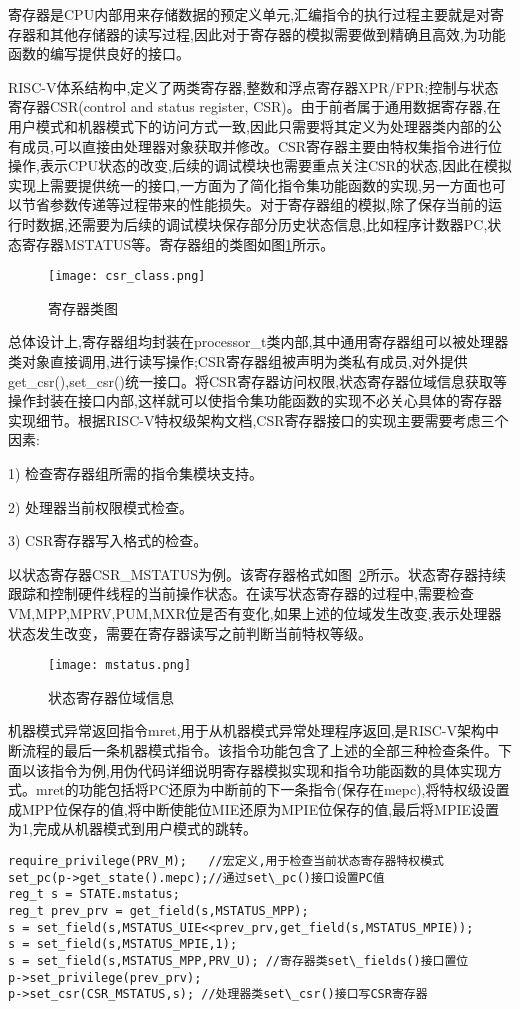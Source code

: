 寄存器是CPU内部用来存储数据的预定义单元,汇编指令的执行过程主要就是对寄存器和其他存储器的读写过程,因此对于寄存器的模拟需要做到精确且高效,为功能函数的编写提供良好的接口。


RISC-V体系结构中,定义了两类寄存器,整数和浮点寄存器XPR/FPR;控制与状态寄存器CSR(control and status register, CSR)。由于前者属于通用数据寄存器,在用户模式和机器模式下的访问方式一致,因此只需要将其定义为处理器类内部的公有成员,可以直接由处理器对象获取并修改。CSR寄存器主要由特权集指令进行位操作,表示CPU状态的改变,后续的调试模块也需要重点关注CSR的状态,因此在模拟实现上需要提供统一的接口,一方面为了简化指令集功能函数的实现,另一方面也可以节省参数传递等过程带来的性能损失。对于寄存器组的模拟,除了保存当前的运行时数据,还需要为后续的调试模块保存部分历史状态信息,比如程序计数器PC,状态寄存器MSTATUS等。寄存器组的类图如图\ref{fig:csr_class}所示。
\begin{figure}[h]
    \centering
    \texttt{[image: csr\_class.png]}
    \caption{寄存器类图}
    \label{fig:csr_class}
\end{figure}

总体设计上,寄存器组均封装在processor\_t类内部,其中通用寄存器组可以被处理器类对象直接调用,进行读写操作;CSR寄存器组被声明为类私有成员,对外提供get\_csr(),set\_csr()统一接口。将CSR寄存器访问权限,状态寄存器位域信息获取等操作封装在接口内部,这样就可以使指令集功能函数的实现不必关心具体的寄存器实现细节。根据RISC-V特权级架构文档,CSR寄存器接口的实现主要需要考虑三个因素:


1) 检查寄存器组所需的指令集模块支持。


2) 处理器当前权限模式检查。


3) CSR寄存器写入格式的检查。


以状态寄存器CSR\_MSTATUS为例。该寄存器格式如图~\ref{fig:mstatus}所示。状态寄存器持续跟踪和控制硬件线程的当前操作状态。在读写状态寄存器的过程中,需要检查VM,MPP,MPRV,PUM,MXR位是否有变化,如果上述的位域发生改变,表示处理器状态发生改变，需要在寄存器读写之前判断当前特权等级。
\begin{figure}[H]
    \centering
    \texttt{[image: mstatus.png]}
    \caption{状态寄存器位域信息}
    \label{fig:mstatus}
\end{figure}


机器模式异常返回指令mret,用于从机器模式异常处理程序返回,是RISC-V架构中断流程的最后一条机器模式指令。该指令功能包含了上述的全部三种检查条件。下面以该指令为例,用伪代码详细说明寄存器模拟实现和指令功能函数的具体实现方式。mret的功能包括将PC还原为中断前的下一条指令(保存在mepc),将特权级设置成MPP位保存的值,将中断使能位MIE还原为MPIE位保存的值,最后将MPIE设置为1,完成从机器模式到用户模式的跳转。
\begin{lstlisting}
require_privilege(PRV_M);   //宏定义,用于检查当前状态寄存器特权模式
set_pc(p->get_state().mepc);//通过set\_pc()接口设置PC值
reg_t s = STATE.mstatus;    
reg_t prev_prv = get_field(s,MSTATUS_MPP);
s = set_field(s,MSTATUS_UIE<<prev_prv,get_field(s,MSTATUS_MPIE));
s = set_field(s,MSTATUS_MPIE,1); 
s = set_field(s,MSTATUS_MPP,PRV_U); //寄存器类set\_fields()接口置位
p->set_privilege(prev_prv);
p->set_csr(CSR_MSTATUS,s); //处理器类set\_csr()接口写CSR寄存器
\end{lstlisting}

